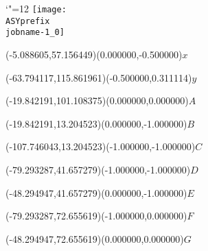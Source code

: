 \setlength{\unitlength}{1pt}%
\makeatletter%
\let\ASYencoding\f@encoding%
\let\ASYfamily\f@family%
\let\ASYseries\f@series%
\let\ASYshape\f@shape%
\makeatother%
{\catcode`"=12%
\texttt{[image: \\ASYprefix\\jobname-1\_0]}%
}%
%
\fontsize{6.000000}{7.200000}\selectfont%
\usefont{\ASYencoding}{\ASYfamily}{\ASYseries}{\ASYshape}%
\ASYalign(-5.088605,57.156449)(0.000000,-0.500000){$x$}%
%
\fontsize{6.000000}{7.200000}\selectfont%
\ASYalign(-63.794117,115.861961)(-0.500000,0.311114){$y$}%
%
\fontsize{6.000000}{7.200000}\selectfont%
\ASYalign(-19.842191,101.108375)(0.000000,0.000000){$A$}%
%
\fontsize{6.000000}{7.200000}\selectfont%
\ASYalign(-19.842191,13.204523)(0.000000,-1.000000){$B$}%
%
\fontsize{6.000000}{7.200000}\selectfont%
\ASYalign(-107.746043,13.204523)(-1.000000,-1.000000){$C$}%
%
\fontsize{6.000000}{7.200000}\selectfont%
\ASYalign(-79.293287,41.657279)(-1.000000,-1.000000){$D$}%
%
\fontsize{6.000000}{7.200000}\selectfont%
\ASYalign(-48.294947,41.657279)(0.000000,-1.000000){$E$}%
%
\fontsize{6.000000}{7.200000}\selectfont%
\ASYalign(-79.293287,72.655619)(-1.000000,0.000000){$F$}%
%
\fontsize{6.000000}{7.200000}\selectfont%
\ASYalign(-48.294947,72.655619)(0.000000,0.000000){$G$}%
